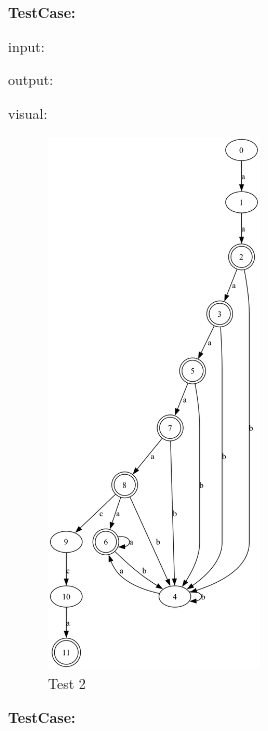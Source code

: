 \documentclass{hdureport}
\begin{document}
\newpage

\noindent\textbf{TestCase:} 

\noindent\textsf{input:}

\noindent\textsf{output:}

\newpage
\noindent\textsf{visual:}
\begin{figure}[H]
    \centering
    \includegraphics[width=0.5\textwidth]{dfa_test/2.png}
    \caption{Test 2}
\end{figure}

\newpage

\noindent\textbf{TestCase:} 
\end{document}
